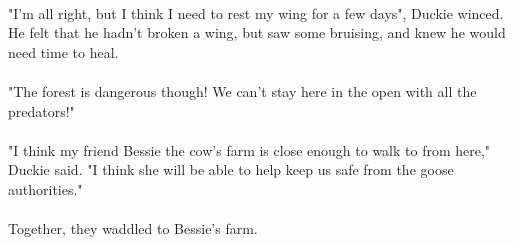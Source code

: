 \paragraph{} "I'm all right, but I think I need to rest my wing for a few days", Duckie winced. He felt that he hadn't broken a wing, but saw some bruising, and knew he would need time to heal. 
 \paragraph{} "The forest is dangerous though! We can't stay here in the open with all the predators!"
 \paragraph{} "I think my friend Bessie the cow's farm is close enough to walk to from here," Duckie said. "I think she will be able to help keep us safe from the goose authorities."
 \paragraph{} Together, they waddled to Bessie's farm.